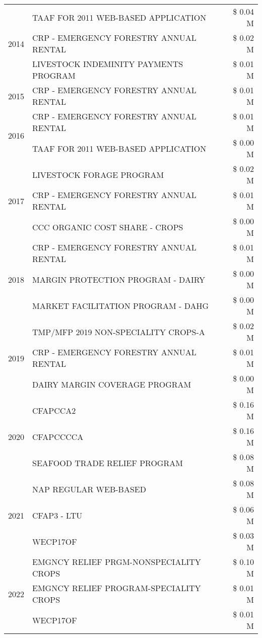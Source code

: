 \begin{tabular}{llr}
\cline{1-3}
\multirow[t]{3}{*}{2014} & TAAF FOR 2011 WEB-BASED APPLICATION & \$ 0.04 M \\
 & CRP - EMERGENCY FORESTRY ANNUAL RENTAL & \$ 0.02 M \\
 & LIVESTOCK INDEMINITY PAYMENTS PROGRAM & \$ 0.01 M \\
\cline{1-3}
2015 & CRP - EMERGENCY FORESTRY ANNUAL RENTAL & \$ 0.01 M \\
\cline{1-3}
\multirow[t]{2}{*}{2016} & CRP - EMERGENCY FORESTRY ANNUAL RENTAL & \$ 0.01 M \\
 & TAAF FOR 2011 WEB-BASED APPLICATION & \$ 0.00 M \\
\cline{1-3}
\multirow[t]{3}{*}{2017} & LIVESTOCK FORAGE PROGRAM & \$ 0.02 M \\
 & CRP - EMERGENCY FORESTRY ANNUAL RENTAL & \$ 0.01 M \\
 & CCC ORGANIC COST SHARE - CROPS & \$ 0.00 M \\
\cline{1-3}
\multirow[t]{3}{*}{2018} & CRP - EMERGENCY FORESTRY ANNUAL RENTAL & \$ 0.01 M \\
 & MARGIN PROTECTION PROGRAM - DAIRY & \$ 0.00 M \\
 & MARKET FACILITATION PROGRAM - DAHG & \$ 0.00 M \\
\cline{1-3}
\multirow[t]{3}{*}{2019} & TMP/MFP 2019 NON-SPECIALITY CROPS-A & \$ 0.02 M \\
 & CRP - EMERGENCY FORESTRY ANNUAL RENTAL & \$ 0.01 M \\
 & DAIRY MARGIN COVERAGE PROGRAM & \$ 0.00 M \\
\cline{1-3}
\multirow[t]{3}{*}{2020} & CFAPCCA2 & \$ 0.16 M \\
 & CFAPCCCCA & \$ 0.16 M \\
 & SEAFOOD TRADE RELIEF PROGRAM & \$ 0.08 M \\
\cline{1-3}
\multirow[t]{3}{*}{2021} & NAP REGULAR WEB-BASED & \$ 0.08 M \\
 & CFAP3 - LTU & \$ 0.06 M \\
 & WECP17OF & \$ 0.03 M \\
\cline{1-3}
\multirow[t]{3}{*}{2022} & EMGNCY RELIEF PRGM-NONSPECIALITY CROPS & \$ 0.10 M \\
 & EMGNCY RELIEF PROGRAM-SPECIALITY CROPS & \$ 0.01 M \\
 & WECP17OF & \$ 0.01 M \\
\cline{1-3}
\bottomrule
\end{tabular}
